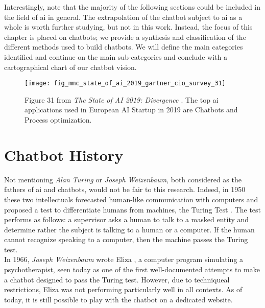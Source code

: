 Interestingly, note that the majority of the following sections could be included in the field of \gls{ai} in general. The extrapolation of the chatbot subject to \gls{ai} as a whole is worth further studying, but not in this work. Instead, the focus of this chapter is placed on chatbots; we provide a synthesis and classification of the different methods used to build chatbots. We will define the main categories identified and continue on the main sub-categories and conclude with a cartographical chart of our chatbot vision.



\begin{figure}[H]
    \centering
    \texttt{[image: fig\_mmc\_state\_of\_ai\_2019\_gartner\_cio\_survey\_31]}
    \caption{Figure 31 from \textit{The State of AI 2019: Divergence \autocite{report:Kelnar2019}}. The top \gls{ai} applications used in European AI Startup in 2019 are Chatbots and Process optimization.}
    \label{fig:fig_mmc_state_of_ai_2019_gartner_cio_survey_31}
\end{figure}



\section{Chatbot History}
\label{chatbot:history}
Not mentioning \textit{Alan Turing} or \textit{Joseph Weizenbaum}, both considered as the fathers of \gls{ai} and chatbots, would not be fair to this research. Indeed, in 1950 these two intellectuals forecasted human-like communication with computers and proposed a test to differentiate humans from machines, the Turing Test \autocite{paper:turing}. The test performs as follows: a supervisor asks a human to talk to a masked entity and determine rather the subject is talking to a human or a computer. If the human cannot recognize speaking to a computer, then the machine passes the Turing test.\\

In 1966, \textit{Joseph Weizenbaum} wrote Eliza \autocite{website:eliza}, a computer program simulating a psychotherapist, seen today as one of the first well-documented attempts to make a chatbot designed to pass the Turing test. However, due to techniqueal restrictions, Eliza was not performing particularly well in all contexts. As of today, it is still possible to play with the chatbot on a dedicated website.\\

